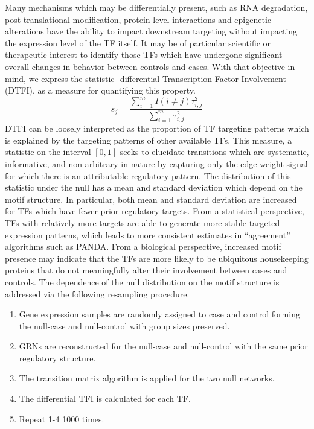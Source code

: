 \documentclass[9pt,twocolumn,twoside]{pnas-new}
\begin{document}
Many mechanisms which may be differentially present, such as RNA degradation,
post-translational modification, protein-level interactions and epigenetic
alterations have the ability to impact downstream targeting without
impacting the expression level of the TF itself. It may be of particular
scientific or therapeutic interest to identify those TFs which have
undergone significant overall changes in behavior between controls
and cases. With that objective in mind, we express the statistic-
differential Transcription Factor Involvement (DTFI), as a measure
for quantifying this property. 
\[
s_{j}=\frac{\sum_{i=1}^{m}I\left(i\ne j\right)\tau_{i,j}^{2}}{\sum_{i=1}^{m}\tau_{i,j}^{2}}
\]
 DTFI can be loosely interpreted as the proportion of TF targeting
patterns which is explained by the targeting patterns of other available
TFs. This measure, a statistic on the interval $[0,1]$ seeks to elucidate
transitions which are systematic, informative, and non-arbitrary in
nature by capturing only the edge-weight signal for which there is
an attributable regulatory pattern. The distribution of this statistic
under the null has a mean and standard deviation which depend on the
motif structure. In particular, both mean and standard deviation are
increased for TFs which have fewer prior regulatory targets. From
a statistical perspective, TFs with relatively more targets are able
to generate more stable targeted expression patterns, which leads
to more consistent estimates in \textquotedblleft agreement\textquotedblright{}
algorithms such as PANDA. From a biological perspective, increased
motif presence may indicate that the TFs are more likely to be ubiquitous
housekeeping proteins that do not meaningfully alter their involvement
between cases and controls. The dependence of the null distribution
on the motif structure is addressed via the following resampling procedure. 
\begin{enumerate}
\item Gene expression samples are randomly assigned to case and control
forming the null-case and null-control with group sizes preserved. 
\item GRNs are reconstructed for the null-case and null-control with the
same prior regulatory structure. 
\item The transition matrix algorithm is applied for the two null networks. 
\item The differential TFI is calculated for each TF. 
\item Repeat 1-4 1000 times. 
\end{enumerate}
\end{document}
